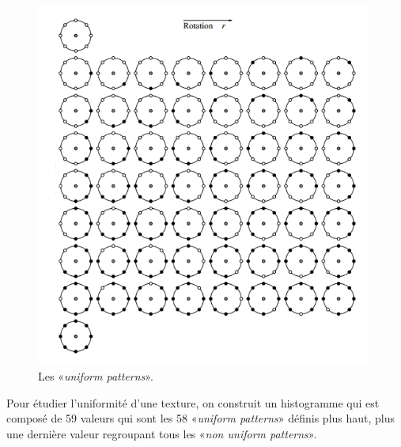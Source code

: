 \begin{figure}[H]
	\centering
	\includegraphics[height = 12cm]{Figures/chap1/uniforme.png}		
	\caption[uniforme]{ Les «\textit{uniform patterns}».}
\end{figure}	

\indent Pour étudier l’uniformité d'une texture, on construit un histogramme qui est composé de 59 valeurs qui sont les 58 «\textit{uniform patterns}» définis plus haut, plus une dernière valeur regroupant tous les «\textit{non uniform patterns}».\\

